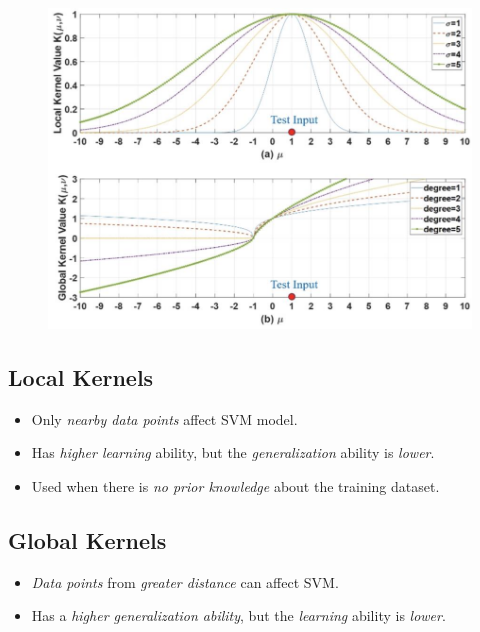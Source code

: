 \documentclass[
	number={2},
	title={Learning Linear Separators{,} SVMs and Kernels}
]{cs584notes}
\begin{document}
\begin{minipage}[m]{0.55\textwidth}
	\begin{figure}[H]
		\centering
		\includegraphics[width=\textwidth]{figures/2/kernels}
		\caption{}
		\label{fig:kernel-graphs}
	\end{figure}
\end{minipage}\hfill%
\begin{minipage}[m]{0.45\textwidth}
	\subsection{Local Kernels}\label{subsec:local-kernels}
	\begin{itemize}
		\item Only \emph{nearby data points} affect SVM model.
		\item Has \emph{higher learning} ability, but the \emph{generalization} ability is \emph{lower}.
		\item Used when there is \emph{no prior knowledge} about the training dataset.
	\end{itemize}

	\subsection{Global Kernels}\label{subsec:global-kernels}
	\begin{itemize}
		\item \emph{Data points} from \emph{greater distance} can affect SVM\@.
		\item Has a \emph{higher generalization ability}, but the \emph{learning} ability is \emph{lower}.
	\end{itemize}
\end{minipage}
\end{document}
